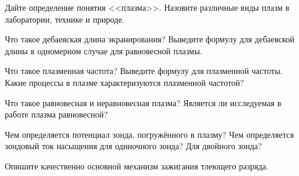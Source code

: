 \begin{lab:questions}
    \item Дайте определение понятия <<плазма>>.
    Назовите различные виды плазм в лаборатории, технике и природе.
    
    \item Что такое дебаевская длина экранирования? Выведите формулу
    для дебаевской длины в одномерном случае для равновесной плазмы.
    
    \item Что такое плазменная частота? Выведите формулу для плазменной частоты.
    Какие процессы в плазме характеризуются плазменной частотой?
    
    \item Что такое равновесная и неравновесная плазма? 
    Является ли исследуемая в работе плазма равновесной?
    
   \item Чем определяется потенциал зонда, погружённого в плазму?
   Чем определяется зондовый ток насыщения для одиночного зонда? Для двойного
   зонда?
    
    
    \item Опишите качественно основной механизм зажигания тлеющего разряда.
\end{lab:questions}



